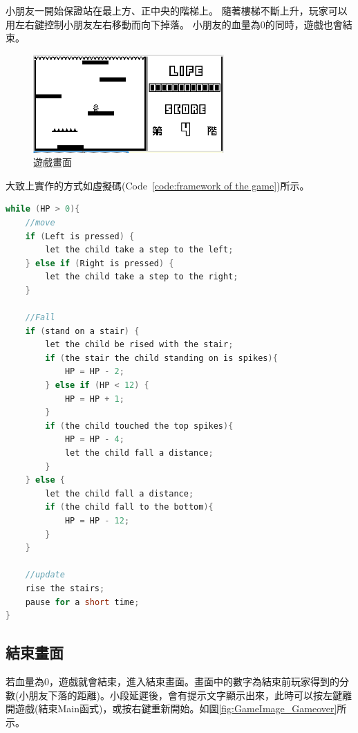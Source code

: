 \documentclass[12pt,a4paper]{article}
\begin{document}
小朋友一開始保證站在最上方、正中央的階梯上。
隨著樓梯不斷上升，玩家可以用左右鍵控制小朋友左右移動而向下掉落。
小朋友的血量為0的同時，遊戲也會結束。

\begin{figure}[H]
\centering
\includegraphics[width=0.65\textwidth]{GameImage_map.png}
\caption{\label{fig:GameImage_map}遊戲畫面}
\end{figure}

\newpage
大致上實作的方式如虛擬碼(Code~\ref{code:framework of the game})所示。

\begin{lstlisting}[language=java, caption={the framework of the game},label=code:framework of the game]
while (HP > 0){
    //move
    if (Left is pressed) {
        let the child take a step to the left;
    } else if (Right is pressed) {
        let the child take a step to the right;
    }
    
    //Fall
    if (stand on a stair) {
        let the child be rised with the stair;
        if (the stair the child standing on is spikes){
            HP = HP - 2;
        } else if (HP < 12) {
            HP = HP + 1;
        }
        if (the child touched the top spikes){
            HP = HP - 4;
            let the child fall a distance;
        }
    } else {
        let the child fall a distance;
        if (the child fall to the bottom){
            HP = HP - 12;
        }
    }
    
    //update
    rise the stairs;
    pause for a short time;
}
\end{lstlisting}


\newpage

\subsection{結束畫面}

若血量為0，遊戲就會結束，進入結束畫面。畫面中的數字為結束前玩家得到的分數(小朋友下落的距離)。小段延遲後，會有提示文字顯示出來，此時可以按左鍵離開遊戲(結束Main函式)，或按右鍵重新開始。如圖\ref{fig:GameImage_Gameover}所示。
\end{document}

